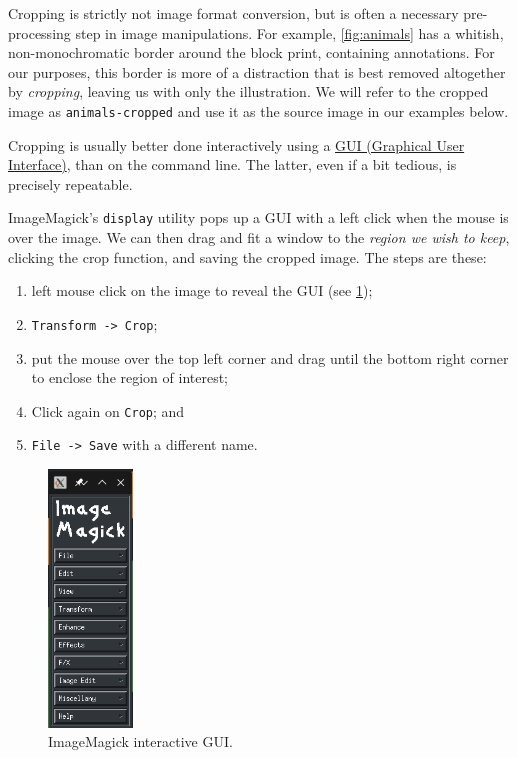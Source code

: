 \documentclass[
  11pt,
  british,
  a4paper,
]{article}
\providecommand{\tightlist}{%
  \setlength{\itemsep}{0pt}\setlength{\parskip}{0pt}}
\begin{document}
Cropping is strictly not image format conversion, but is often a
necessary pre-processing step in image manipulations. For example,
\cref{fig:animals} has a whitish, non-monochromatic border around the
block print, containing annotations. For our purposes, this border is
more of a distraction that is best removed altogether by
\emph{cropping}, leaving us with only the illustration. We will refer to
the cropped image as \texttt{animals-cropped} and use it as the source
image in our examples below.

Cropping is usually better done interactively using a
\href{https://en.wikipedia.org/wiki/Graphical_user_interface}{GUI
(Graphical User Interface)}, than on the command line. The latter, even
if a bit tedious, is precisely repeatable.

ImageMagick's \texttt{display} utility pops up a GUI with a left click
when the mouse is over the image. We can then drag and fit a window to
the \emph{region we wish to keep}, clicking the crop function, and
saving the cropped image. The steps are these:

\begin{enumerate}
\def\labelenumi{\alph{enumi}.}
\tightlist
\item
  left mouse click on the image to reveal the GUI (see \cref{fig:gui});
\item
  \texttt{Transform\ -\textgreater{}\ Crop};
\item
  put the mouse over the top left corner and drag until the bottom right
  corner to enclose the region of interest;
\item
  Click again on \texttt{Crop}; and
\item
  \texttt{File\ -\textgreater{}\ Save} with a different name.
\end{enumerate}

\begin{figure}
\hypertarget{fig:gui}{%
\centering
\includegraphics[width=0.2\textwidth,height=\textheight]{images/ImageMagick-display-gui.png}
\caption{ImageMagick interactive GUI.}\label{fig:gui}
}
\end{figure}
\end{document}
